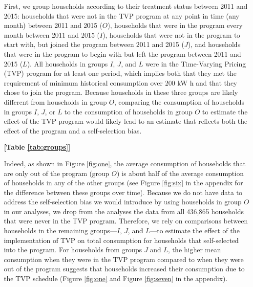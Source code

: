 \documentclass[12pt]{article}
\begin{document}
First, we group households according to their treatment status between 2011 and 2015: households that were not in the TVP program at any point in time (any month) between 2011 and 2015 ($O$), households that were in the program every month between 2011 and 2015 ($I$), households that were not in the program to start with, but joined the program between 2011 and 2015 ($J$), and households that were in the program to begin with but left the program between 2011 and 2015 ($L$). All households in groups $I$, $J$, and $L$ were in the Time-Varying Pricing (TVP) program for at least one period, which implies both that they met the requirement of minimum historical consumption over 200 kW h and that they chose to join the program. Because households in these three groups are likely different from households in group $O$, comparing the consumption of households in groups $I$, $J$, or $L$ to the consumption of households in group $O$ to estimate the effect of the TVP program would likely lead to an estimate that reflects both the effect of the program and a self-selection bias.

\centerline{\textbf{[Table \ref{tab:groups}]}}


Indeed, as shown in Figure \ref{fig:one}, the average consumption of households that are only out of the program (group $O$) is about half of the average consumption of households in any of the other groups (see Figure \ref{fig:six} in the appendix for the difference between these groups over time). Because we do not have data to address the self-selection bias we would introduce by using households in group $O$ in our analyses, we drop from the analyses the data from all 436,865 households that were never in the TVP program. Therefore, we rely on comparisons between households in the remaining groups---$I$, $J$, and  $L$---to estimate the effect of the implementation of TVP on total consumption for households that self-selected into the program. For households from groups $J$ and $L$, the higher mean consumption when they were in the TVP program compared to when they were out of the program suggests that households increased their consumption due to the TVP schedule (Figure \ref{fig:one} and Figure \ref{fig:seven} in the appendix).
\end{document}
